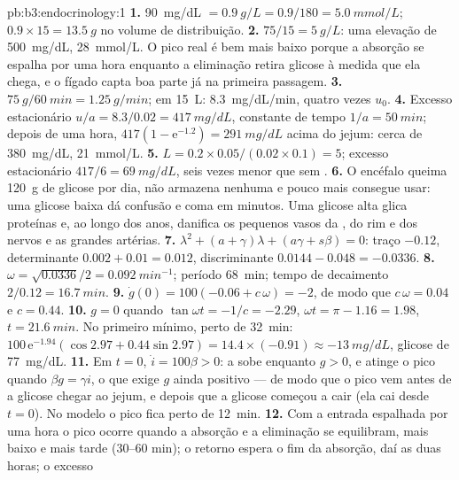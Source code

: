\begin{solution}{pb:b3:endocrinology:1}
\textbf{1.} \qty{90}{mg/dL} $= \qty{0.9}{g/L} = 0.9/180 = \qty{5.0}{mmol/L}$;
$0.9\times 15 = \qty{13.5}{g}$ no volume de distribuição.
\textbf{2.} $75/15 = \qty{5}{g/L}$: uma elevação de \qty{500}{mg/dL},
\qty{28}{mmol/L}. O pico real é bem mais baixo porque a absorção se
espalha por uma hora enquanto a eliminação retira glicose à medida que
ela chega, e o fígado capta boa parte já na primeira passagem.
\textbf{3.} $\qty{75}{g}/\qty{60}{min} = \qty{1.25}{g/min}$; em
\qty{15}{L}: \qty{8.3}{mg/dL/min}, quatro vezes $u_{0}$.
\textbf{4.} Excesso estacionário $u/a = 8.3/0.02 = \qty{417}{mg/dL}$,
constante de tempo $1/a = \qty{50}{min}$; depois de uma hora, $417(1 -
\mathrm{e}^{-1.2}) = \qty{291}{mg/dL}$ acima do jejum: cerca de
\qty{380}{mg/dL}, \qty{21}{mmol/L}.
\textbf{5.} $L = 0.2\times 0.05/(0.02\times 0.1) = 5$; excesso
estacionário $417/6 = \qty{69}{mg/dL}$, seis vezes menor que sem
.
\textbf{6.} O encéfalo queima \qty{120}{g} de glicose por dia, não
armazena nenhuma e pouco mais consegue usar: uma glicose baixa dá
confusão e coma em minutos. Uma glicose alta glica proteínas e, ao longo
dos anos, danifica os pequenos vasos da , do rim e dos nervos e as
grandes artérias.
\textbf{7.} $\lambda^{2} + (a + \gamma)\lambda + (a\gamma + s\beta) = 0$:
traço $-0.12$, determinante $0.002 + 0.01 = 0.012$, discriminante
$0.0144 - 0.048 = -0.0336$.
\textbf{8.} $\omega = \sqrt{0.0336}/2 = \qty{0.092}{min^{-1}}$; período
\qty{68}{min}; tempo de decaimento $2/0.12 = \qty{16.7}{min}$.
\textbf{9.} $\dot g(0) = 100(-0.06 + c\,\omega) = -2$, de modo que
$c\,\omega =
0.04$ e $c = 0.44$.
\textbf{10.} $g = 0$ quando $\tan\omega t = -1/c = -2.29$, $\omega t =
\pi - 1.16 = 1.98$, $t = \qty{21.6}{min}$. No primeiro mínimo, perto de
\qty{32}{min}: $100\,\mathrm{e}^{-1.94}(\cos 2.97 + 0.44\sin 2.97) =
14.4\times(-0.91) \approx -\qty{13}{mg/dL}$, glicose de \qty{77}{mg/dL}.
\textbf{11.} Em $t = 0$, $\dot i = 100\beta > 0$: a  sobe
enquanto $g > 0$, e atinge o pico quando $\beta g = \gamma i$, o que
exige $g$ ainda positivo --- de modo que o pico vem antes de a glicose
chegar ao jejum, e depois que a glicose começou a cair (ela cai desde $t = 0$). No modelo o pico fica perto de \qty{12}{min}.
\textbf{12.} Com a entrada espalhada por uma hora o pico ocorre quando a
absorção e a eliminação se equilibram, mais baixo e mais tarde (30--60
min); o retorno espera o fim da absorção, daí as duas horas; o excesso

\end{solution}

